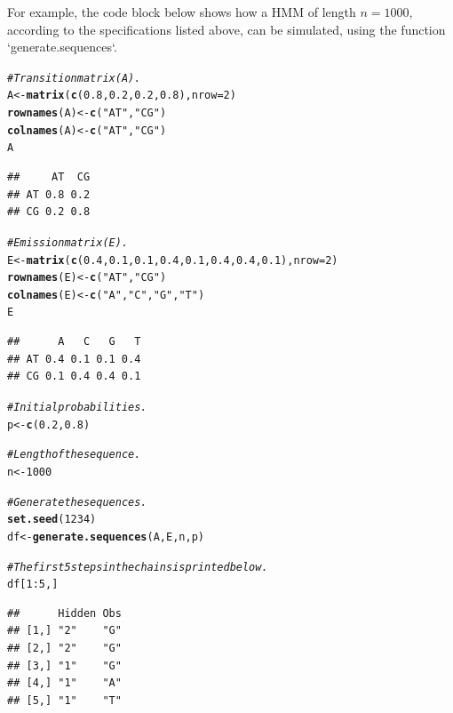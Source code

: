 \documentclass{article}\usepackage[]{graphicx}\usepackage[]{color}
\makeatletter
\newcommand{\hlnum}[1]{\textcolor[rgb]{0.686,0.059,0.569}{#1}}%
\newcommand{\hlstr}[1]{\textcolor[rgb]{0.192,0.494,0.8}{#1}}%
\newcommand{\hlcom}[1]{\textcolor[rgb]{0.678,0.584,0.686}{\textit{#1}}}%
\newcommand{\hlopt}[1]{\textcolor[rgb]{0,0,0}{#1}}%
\newcommand{\hlstd}[1]{\textcolor[rgb]{0.345,0.345,0.345}{#1}}%
\newcommand{\hlkwb}[1]{\textcolor[rgb]{0.69,0.353,0.396}{#1}}%
\newcommand{\hlkwc}[1]{\textcolor[rgb]{0.333,0.667,0.333}{#1}}%
\newcommand{\hlkwd}[1]{\textcolor[rgb]{0.737,0.353,0.396}{\textbf{#1}}}%
\newenvironment{kframe}{%
 \def\at@end@of@kframe{}%
 \ifinner\ifhmode%
  \def\at@end@of@kframe{\end{minipage}}%
  \begin{minipage}{\columnwidth}%
 \fi\fi%
 \def\FrameCommand##1{\hskip\@totalleftmargin \hskip-\fboxsep
 \colorbox{shadecolor}{##1}\hskip-\fboxsep
     \hskip-\linewidth \hskip-\@totalleftmargin \hskip\columnwidth}%
 \MakeFramed {\advance\hsize-\width
   \@totalleftmargin\z@ \linewidth\hsize
   \@setminipage}}%
 {\par\unskip\endMakeFramed%
 \at@end@of@kframe}
\newenvironment{knitrout}{}{} %
\makeatother
\begin{document}
For example, the code block below shows how a HMM of length $n = 1000$, according to the specifications listed above, can be simulated, using the function `generate.sequences`.

\begin{knitrout}
\color{fgcolor}\begin{kframe}
\begin{alltt}
\hlcom{# Transition matrix (A).}
\hlstd{A} \hlkwb{<-} \hlkwd{matrix}\hlstd{(}\hlkwd{c}\hlstd{(}\hlnum{0.8}\hlstd{,} \hlnum{0.2}\hlstd{,} \hlnum{0.2}\hlstd{,} \hlnum{0.8}\hlstd{),} \hlkwc{nrow} \hlstd{=} \hlnum{2}\hlstd{)}
\hlkwd{rownames}\hlstd{(A)} \hlkwb{<-} \hlkwd{c}\hlstd{(}\hlstr{"AT"}\hlstd{,} \hlstr{"CG"}\hlstd{)}
\hlkwd{colnames}\hlstd{(A)} \hlkwb{<-} \hlkwd{c}\hlstd{(}\hlstr{"AT"}\hlstd{,} \hlstr{"CG"}\hlstd{)}
\hlstd{A}
\end{alltt}
\begin{verbatim}
##     AT  CG
## AT 0.8 0.2
## CG 0.2 0.8
\end{verbatim}
\begin{alltt}
\hlcom{# Emission matrix (E).}
\hlstd{E} \hlkwb{<-} \hlkwd{matrix}\hlstd{(}\hlkwd{c}\hlstd{(}\hlnum{0.4}\hlstd{,} \hlnum{0.1}\hlstd{,} \hlnum{0.1}\hlstd{,} \hlnum{0.4}\hlstd{,} \hlnum{0.1}\hlstd{,} \hlnum{0.4}\hlstd{,} \hlnum{0.4}\hlstd{,} \hlnum{0.1}\hlstd{),} \hlkwc{nrow} \hlstd{=} \hlnum{2}\hlstd{)}
\hlkwd{rownames}\hlstd{(E)} \hlkwb{<-} \hlkwd{c}\hlstd{(}\hlstr{"AT"}\hlstd{,} \hlstr{"CG"}\hlstd{)}
\hlkwd{colnames}\hlstd{(E)} \hlkwb{<-} \hlkwd{c}\hlstd{(}\hlstr{"A"}\hlstd{,} \hlstr{"C"}\hlstd{,} \hlstr{"G"}\hlstd{,} \hlstr{"T"}\hlstd{)}
\hlstd{E}
\end{alltt}
\begin{verbatim}
##      A   C   G   T
## AT 0.4 0.1 0.1 0.4
## CG 0.1 0.4 0.4 0.1
\end{verbatim}
\begin{alltt}
\hlcom{# Initial probabilities.}
\hlstd{p} \hlkwb{<-} \hlkwd{c}\hlstd{(}\hlnum{0.2}\hlstd{,}\hlnum{0.8}\hlstd{)}

\hlcom{# Length of the sequence.}
\hlstd{n} \hlkwb{<-} \hlnum{1000}

\hlcom{# Generate the sequences. }
\hlkwd{set.seed}\hlstd{(}\hlnum{1234}\hlstd{)}
\hlstd{df} \hlkwb{<-} \hlkwd{generate.sequences}\hlstd{(A, E, n, p)}

\hlcom{# The first 5 steps in the chains is printed below. }
\hlstd{df[}\hlnum{1}\hlopt{:}\hlnum{5}\hlstd{, ]}
\end{alltt}
\begin{verbatim}
##      Hidden Obs
## [1,] "2"    "G"
## [2,] "2"    "G"
## [3,] "1"    "G"
## [4,] "1"    "A"
## [5,] "1"    "T"
\end{verbatim}
\end{kframe}
\end{knitrout}
\end{document}
